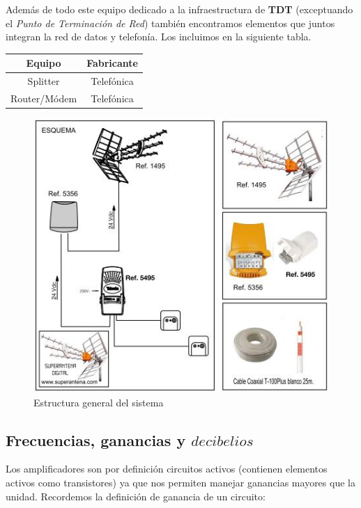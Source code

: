 \documentclass{article}[12 pt]
\begin{document}
		Además de todo este equipo dedicado a la infraestructura de \textbf{TDT} (exceptuando el \textit{Punto de Terminación de Red}) también encontramos elementos que juntos integran la red de datos y telefonía. Los incluimos en la siguiente tabla.

		\vskip 3mm

		\begin{center}
			\begin{tabular}{| c | c |}
				\hline
				\textbf{Equipo} & \textbf{Fabricante}\\
				\hline
				Splitter & Telefónica\\
				\hline
				Router/Módem & Telefónica\\
				\hline
			\end{tabular}
		\end{center}

		\vskip 3mm


		\begin{figure}
				\centering
				\includegraphics{schematic.jpg}
				\caption{Estructura general del sistema}
				\label{f:schematic}
		\end{figure}

		\subsection{Frecuencias, ganancias y $decibelios$}
			Los amplificadores son por definición circuitos activos (contienen elementos activos como transistores) ya que nos permiten manejar ganancias mayores que la unidad. Recordemos la definición de ganancia de un circuito:
\end{document}
